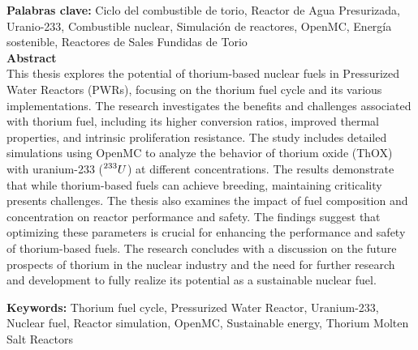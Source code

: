 \vspace{1.0cm}

\textbf{\small Palabras clave:} Ciclo del combustible de torio, Reactor de Agua Presurizada, Uranio-233, Combustible nuclear, Simulación de reactores, OpenMC, Energía sostenible, Reactores de Sales Fundidas de Torio\\

\newpage
\textbf{\LARGE Abstract}\\

This thesis explores the potential of thorium-based nuclear fuels in Pressurized Water Reactors (PWRs), focusing on the thorium fuel cycle and its various implementations. The research investigates the benefits and challenges associated with thorium fuel, including its higher conversion ratios, improved thermal properties, and intrinsic proliferation resistance. The study includes detailed simulations using OpenMC to analyze the behavior of thorium oxide (ThOX) with uranium-233 (\(\prescript{233}{}{U}\)) at different concentrations. The results demonstrate that while thorium-based fuels can achieve breeding, maintaining criticality presents challenges. The thesis also examines the impact of fuel composition and concentration on reactor performance and safety. The findings suggest that optimizing these parameters is crucial for enhancing the performance and safety of thorium-based fuels. The research concludes with a discussion on the future prospects of thorium in the nuclear industry and the need for further research and development to fully realize its potential as a sustainable nuclear fuel.

\vspace{1.0cm}

\textbf{\small Keywords:} Thorium fuel cycle, Pressurized Water Reactor, Uranium-233, Nuclear fuel, Reactor simulation, OpenMC, Sustainable energy, Thorium Molten Salt Reactors\\